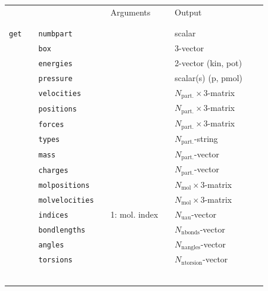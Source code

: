 \documentclass[11pt]{article}
\begin{document}
\begin{center}
  
  \begin{tabular}{cclclclll}
    {\color{red}{\textbf{Action}}} && {\color{blue}{Specifier}} && Arguments && Output \\
                                   && && && \\
    \hline
                                   && && && \\
    \verb!get! && \verb!numbpart!&& && scalar\\
    $\mbox{}$  && \verb!box! && && 3-vector \\
    $\mbox{}$  && \verb!energies! && && 2-vector (kin, pot)\\
    $\mbox{}$  && \verb!pressure! && && scalar(s) (p, pmol) \\
    $\mbox{}$  && \verb!velocities! && && $N_\mathrm{part.}\times 3$-matrix \\
    $\mbox{}$  && \verb!positions! && &&  $N_\mathrm{part.}\times 3$-matrix \\
    $\mbox{}$  && \verb!forces! && &&  $N_\mathrm{part.}\times 3$-matrix \\
    $\mbox{}$  && \verb!types! && && $N_\mathrm{part.}$-string \\
    $\mbox{}$  && \verb!mass! && && $N_\mathrm{part.}$-vector \\
    $\mbox{}$  && \verb!charges! && && $N_\mathrm{part.}$-vector \\
    $\mbox{}$  && \verb!molpositions! && && $N_\mathrm{mol}\times 3$-matrix \\
    $\mbox{}$  && \verb!molvelocities! && && $N_\mathrm{mol}\times 3$-matrix \\
    $\mbox{}$ && \verb!indices! && 1: mol. index && $N_\mathrm{uau}$-vector \\
    $\mbox{}$ && \verb!bondlengths! && && $N_\mathrm{nbonds}$-vector \\
    $\mbox{}$ && \verb!angles! && && $N_\mathrm{nangles}$-vector \\
    $\mbox{}$ && \verb!torsions! && && $N_\mathrm{ntorsion}$-vector \\
    $\mbox{}$ && && && \\
    \hline
                                   && && && \\
  \end{tabular}

\end{center}
    
\end{document}
